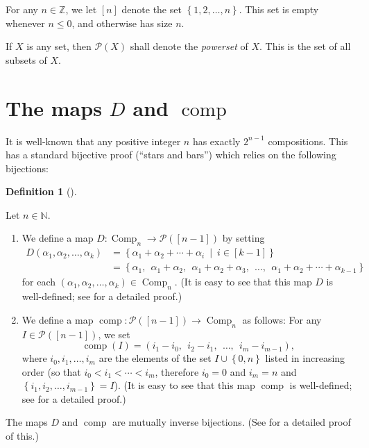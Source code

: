 \documentclass[numbers=enddot,12pt,final,onecolumn,notitlepage]{scrartcl}%
\theoremstyle{definition}
\newtheorem{defi}[theo]{Definition}
\newenvironment{definition}[1][]
{\begin{defi}[#1]\begin{leftbar}}
{\end{leftbar}\end{defi}}
\begin{document}
For any $n\in\mathbb{Z}$, we let $\left[  n\right]  $ denote the set $\left\{
1,2,\ldots,n\right\}  $. This set is empty whenever $n\leq0$, and otherwise
has size $n$.

If $X$ is any set, then $\mathcal{P}\left(  X\right)  $ shall denote the
\emph{powerset} of $X$. This is the set of all subsets of $X$.

\section{The maps $D$ and $\operatorname*{comp}$}

It is well-known that any positive integer $n$ has exactly $2^{n-1}$
compositions. This has a standard bijective proof (\textquotedblleft stars and
bars\textquotedblright) which relies on the following bijections:

\begin{definition}
\label{def.comps.D-comp}Let $n\in\mathbb{N}$.

\begin{enumerate}
\item[\textbf{(a)}] We define a map $D:\operatorname*{Comp}\nolimits_{n}%
\rightarrow\mathcal{P}\left(  \left[  n-1\right]  \right)  $ by
setting\footnotemark%
\begin{align*}
D\left(  \alpha_{1},\alpha_{2},\ldots,\alpha_{k}\right)   &  =\left\{
\alpha_{1}+\alpha_{2}+\cdots+\alpha_{i}\ \mid\ i\in\left[  k-1\right]
\right\} \\
&  =\left\{  \alpha_{1},\ \ \alpha_{1}+\alpha_{2},\ \ \alpha_{1}+\alpha
_{2}+\alpha_{3},\ \ \ldots,\ \ \alpha_{1}+\alpha_{2}+\cdots+\alpha
_{k-1}\right\}
\end{align*}
for each $\left(  \alpha_{1},\alpha_{2},\ldots,\alpha_{k}\right)
\in\operatorname*{Comp}\nolimits_{n}$. (It is easy to see that this map $D$ is
well-defined; see \cite[detailed version, Lemma 10.4]{Grinbe15} for a detailed proof.)

\item[\textbf{(b)}] We define a map $\operatorname*{comp}:\mathcal{P}\left(
\left[  n-1\right]  \right)  \rightarrow\operatorname*{Comp}\nolimits_{n}$ as
follows: For any $I\in\mathcal{P}\left(  \left[  n-1\right]  \right)  $, we
set%
\[
\operatorname*{comp}\left(  I\right)  =\left(  i_{1}-i_{0},\ \ i_{2}%
-i_{1},\ \ \ldots,\ \ i_{m}-i_{m-1}\right)  ,
\]
where $i_{0},i_{1},\ldots,i_{m}$ are the elements of the set $I\cup\left\{
0,n\right\}  $ listed in increasing order (so that $i_{0}<i_{1}<\cdots<i_{m}$,
therefore $i_{0}=0$ and $i_{m}=n$ and $\left\{  i_{1},i_{2},\ldots
,i_{m-1}\right\}  =I$). (It is easy to see that this map $\operatorname*{comp}%
$ is well-defined; see \cite[detailed version, Lemma 10.15 (d)]{Grinbe15} for
a detailed proof.)
\end{enumerate}

The maps $D$ and $\operatorname*{comp}$ are mutually inverse bijections. (See
\cite[detailed version, Proposition 10.17]{Grinbe15} for a detailed proof of this.)
\end{definition}
\end{document}
